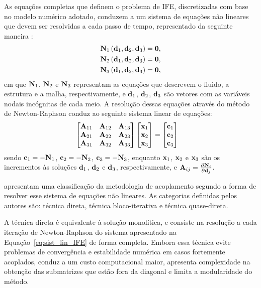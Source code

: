 As equações completas que definem o problema de IFE, discretizadas com base no modelo numérico adotado, conduzem a um sistema de equações não lineares que devem ser resolvidas a cada passo de tempo, representado da seguinte maneira \cite{BazilevsTT:2013a}:
\begin{align}
	\mathbf{N}_{1}\left(\mathbf{d}_{1},\mathbf{d}_{2},\mathbf{d}_{3}\right) = \mathbf{0}, \label{eq:N1}\\ 
	\mathbf{N}_{2}\left(\mathbf{d}_{1},\mathbf{d}_{2},\mathbf{d}_{3}\right) = \mathbf{0},\label{eq:N2}\\
	\mathbf{N}_{3}\left(\mathbf{d}_{1},\mathbf{d}_{2},\mathbf{d}_{3}\right) = \mathbf{0} \label{eq:N3},
\end{align}
\noindent em que $\mathbf{N}_{1}$, $\mathbf{N}_{2}$ e $\mathbf{N}_{3}$ representam as equações que descrevem o fluido, a estrutura e a malha, respectivamente, e $\mathbf{d}_{1}$, $\mathbf{d}_{2}$, $\mathbf{d}_{3}$ são vetores com as variáveis nodais incógnitas de cada meio. A resolução dessas equações através do método de Newton-Raphson conduz ao seguinte sistema linear de equações:
\begin{align}
	\begin{bmatrix}
		\mathbf{A}_{11} & \mathbf{A}_{12} & \mathbf{A}_{13} \\
		\mathbf{A}_{21} & \mathbf{A}_{22} & \mathbf{A}_{23} \\
		\mathbf{A}_{31} & \mathbf{A}_{32} & \mathbf{A}_{33}
	\end{bmatrix}
	\begin{bmatrix}
		\mathbf{x}_{1} \\
		\mathbf{x}_{2} \\
		\mathbf{x}_{3}
	\end{bmatrix}
	&=
	\begin{bmatrix}
		\mathbf{c}_{1} \\
		\mathbf{c}_{2} \\
		\mathbf{c}_{3}
	\end{bmatrix}
	\label{eq:sist_lin_IFE}
\end{align}	
\noindent sendo $\mathbf{c}_{1} = - \mathbf{N}_{1}$, $\mathbf{c}_{2} = - \mathbf{N}_{2}$, $\mathbf{c}_{3} = - \mathbf{N}_{3}$, enquanto $\mathbf{x}_{1}$, $\mathbf{x}_{2}$ e $\mathbf{x}_{3}$ são os incrementos às soluções $\mathbf{d}_{1}$, $\mathbf{d}_{2}$ e $\mathbf{d}_{3}$, respectivamente, e $\mathbf{A}_{ij} = \frac{\partial\mathbf{N}_{i}}{\partial\mathbf{d}_{j}}$. 

 apresentam uma classificação da metodologia de acoplamento segundo a forma de resolver esse sistema de equações não lineares. As categorias definidas pelos autores são: técnica direta, técnica bloco-iterativa e técnica quase-direta. 

A técnica direta é equivalente à solução monolítica, e consiste na resolução a cada iteração de Newton-Raphson do sistema apresentado na Equação~\eqref{eq:sist_lin_IFE} de forma completa. Embora essa técnica evite problemas de convergência e estabilidade numérica em casos fortemente acoplados, conduz a um custo computacional maior, apresenta complexidade na obtenção das submatrizes que estão fora da diagonal e limita a modularidade do método.

